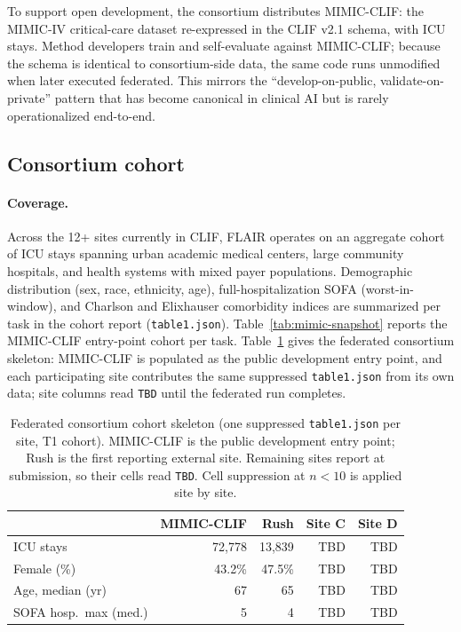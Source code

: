 To support open development, the consortium distributes MIMIC-CLIF:
the MIMIC-IV critical-care dataset \citep{johnson2023mimiciv,johnson2016mimiciii}
re-expressed in the CLIF v2.1 schema, with  ICU
stays. Method developers train and self-evaluate against MIMIC-CLIF;
because the schema is identical to consortium-side data, the same code
runs unmodified when later executed federated. This mirrors the
``develop-on-public, validate-on-private'' pattern that has become
canonical in clinical AI but is rarely operationalized end-to-end.

\subsection*{Consortium cohort}

\paragraph{Coverage.} Across the 12+ sites currently in CLIF, FLAIR
operates on an aggregate cohort of  ICU stays
spanning urban academic medical centers, large community hospitals, and
health systems with mixed payer populations. Demographic distribution
(sex, race, ethnicity, age), full-hospitalization SOFA
(worst-in-window), and Charlson and Elixhauser comorbidity indices are
summarized per task in the cohort report (\texttt{table1.json}).
Table~\ref{tab:mimic-snapshot} reports the MIMIC-CLIF entry-point
cohort per task. Table~\ref{tab:consortium-sites} gives the federated
consortium skeleton: MIMIC-CLIF is populated as the public development
entry point, and each participating site contributes the same suppressed
\texttt{table1.json} from its own data; site columns read \texttt{TBD}
until the federated run completes.

\begin{table}[h]
\centering
\footnotesize
\setlength{\tabcolsep}{5pt}
\begin{tabular}{lrrrr}
\toprule
                       & \textbf{MIMIC-CLIF} & \textbf{Rush} & \textbf{Site C} & \textbf{Site D} \\
\midrule
ICU stays              & 72{,}778 & 13{,}839 & TBD & TBD \\
Female (\%)            & 43.2\%   & 47.5\%   & TBD & TBD \\
Age, median (yr)       & 67       & 65       & TBD & TBD \\
SOFA hosp.\ max (med.) & 5        & 4        & TBD & TBD \\
\bottomrule
\end{tabular}
\caption{Federated consortium cohort skeleton (one suppressed
\texttt{table1.json} per site, T1 cohort). MIMIC-CLIF is the public
development entry point; Rush is the first reporting external site.
Remaining sites report at submission, so their cells read \texttt{TBD}.
Cell suppression at $n{<}10$ is applied site by site.}
\label{tab:consortium-sites}
\end{table}

